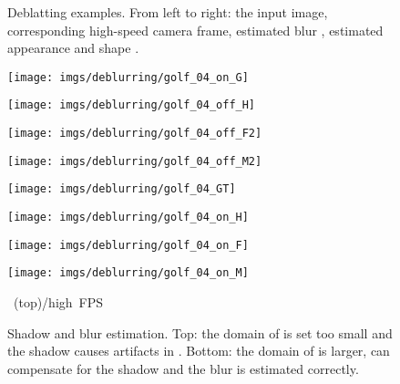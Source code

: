 \documentclass[10pt,twocolumn,letterpaper]{article}
\begin{document}
\begin{figure}
\begin{minipage}[t]{.12\linewidth}
	\end{minipage}\caption{Deblatting examples. From left to right: the input image, corresponding high-speed camera frame, estimated blur , estimated appearance  and shape .}
	\label{fig:deblurring_FMH}
\end{figure} \begin{figure}
	\noindent\begin{minipage}[t]{.24\linewidth}
		\centering
		\texttt{[image: imgs/deblurring/golf\_04\_on\_G]}
	\end{minipage}\hfill \begin{minipage}[t]{.24\linewidth}
		\centering
		\texttt{[image: imgs/deblurring/golf\_04\_off\_H]}
	\end{minipage}\hfill \begin{minipage}[t]{.24\linewidth}
		\centering
		\setlength{\fboxsep}{0pt}\texttt{[image: imgs/deblurring/golf\_04\_off\_F2]}
	\end{minipage}\hfill \begin{minipage}[t]{.24\linewidth}
		\centering
		\setlength{\fboxsep}{0pt}\texttt{[image: imgs/deblurring/golf\_04\_off\_M2]}
	\end{minipage}
\begin{minipage}[t]{.24\linewidth}
		\centering
		\texttt{[image: imgs/deblurring/golf\_04\_GT]}
	\end{minipage}\hfill \begin{minipage}[t]{.24\linewidth}
		\centering
		\texttt{[image: imgs/deblurring/golf\_04\_on\_H]}
	\end{minipage}\hfill \begin{minipage}[t]{.24\linewidth}
		\centering
		\texttt{[image: imgs/deblurring/golf\_04\_on\_F]}
	\end{minipage}\hfill \begin{minipage}[t]{.24\linewidth}
		\centering
		\texttt{[image: imgs/deblurring/golf\_04\_on\_M]}
	\end{minipage}
\begin{minipage}[t]{.24\linewidth}
		\centering\scriptsize
		\mbox{ (top)/high FPS}
	\end{minipage}\hfill \begin{minipage}[t]{.24\linewidth}
		\centering
		
	\end{minipage}\hfill \begin{minipage}[t]{.24\linewidth}
		\centering
		
	\end{minipage}\hfill \begin{minipage}[t]{.24\linewidth}
		\centering
		
	\end{minipage}\caption{Shadow and blur estimation. Top: the domain of  is set too small and the shadow causes artifacts in . Bottom: the domain of  is larger,  can compensate for the shadow and the blur  is estimated correctly.}
	\label{fig:deblurring_shadow}
\end{figure} 
\end{document}
